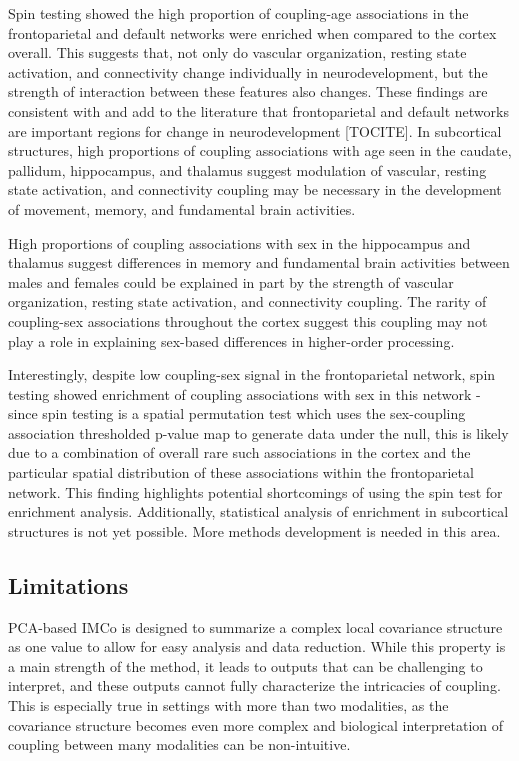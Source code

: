 \documentclass[
  12pt,
]{article}
\begin{document}
Spin testing showed the high proportion of coupling-age associations in the frontoparietal and default networks were enriched when compared to the cortex overall. This suggests that, not only do vascular organization, resting state activation, and connectivity change individually in neurodevelopment, but the strength of interaction between these features also changes. These findings are consistent with and add to the literature that frontoparietal and default networks are important regions for change in neurodevelopment {[}TOCITE{]}. In subcortical structures, high proportions of coupling associations with age seen in the caudate, pallidum, hippocampus, and thalamus suggest modulation of vascular, resting state activation, and connectivity coupling may be necessary in the development of movement, memory, and fundamental brain activities.

High proportions of coupling associations with sex in the hippocampus and thalamus suggest differences in memory and fundamental brain activities between males and females could be explained in part by the strength of vascular organization, resting state activation, and connectivity coupling. The rarity of coupling-sex associations throughout the cortex suggest this coupling may not play a role in explaining sex-based differences in higher-order processing.

Interestingly, despite low coupling-sex signal in the frontoparietal network, spin testing showed enrichment of coupling associations with sex in this network - since spin testing is a spatial permutation test which uses the sex-coupling association thresholded p-value map to generate data under the null, this is likely due to a combination of overall rare such associations in the cortex and the particular spatial distribution of these associations within the frontoparietal network. This finding highlights potential shortcomings of using the spin test for enrichment analysis. Additionally, statistical analysis of enrichment in subcortical structures is not yet possible. More methods development is needed in this area.

\hypertarget{limitations}{%
\subsection{Limitations}\label{limitations}}

PCA-based IMCo is designed to summarize a complex local covariance structure as one value to allow for easy analysis and data reduction. While this property is a main strength of the method, it leads to outputs that can be challenging to interpret, and these outputs cannot fully characterize the intricacies of coupling. This is especially true in settings with more than two modalities, as the covariance structure becomes even more complex and biological interpretation of coupling between many modalities can be non-intuitive.
\end{document}
